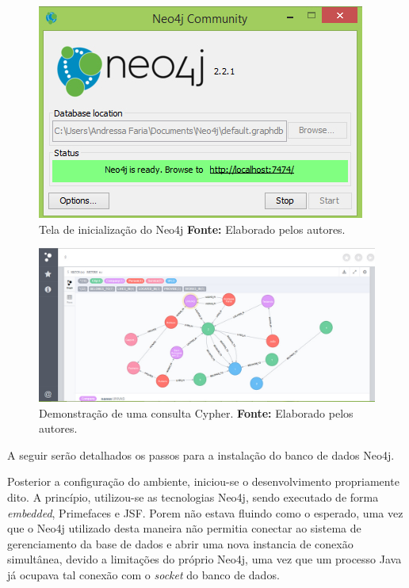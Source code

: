 \newpage
\begin{figure}[h!]
	\centerline{\includegraphics[scale=0.60]{./imagens/neo4j.jpg}}
	\caption[Tela de inicialização do Neo4j ]
	{Tela de inicialização do Neo4j \textbf{Fonte:} Elaborado pelos autores.}
	\label{fig:exemplo1}
\end{figure}

\begin{figure}[h!]
	\centerline{\includegraphics[scale=0.4]{./imagens/neo4j2.jpg}}
	\caption[Demonstração de uma consulta Cypher.]
	{Demonstração de uma consulta Cypher. \textbf{Fonte:} Elaborado pelos autores.}
	\label{fig:exemplo1}
\end{figure}

\par A seguir serão detalhados os passos para a instalação do banco de dados Neo4j.

\par Posterior a configuração do ambiente, iniciou-se o desenvolvimento propriamente dito. A princípio, utilizou-se as tecnologias Neo4j, sendo executado de forma \textit{embedded}, Primefaces e JSF. Porem não estava fluindo como o esperado, uma vez que o Neo4j utilizado desta maneira não permitia conectar ao sistema de gerenciamento da base de dados e abrir uma nova instancia de conexão simultânea, devido a limitações do próprio Neo4j, uma vez que um processo Java já ocupava tal conexão com o \textit{socket} do banco de dados.

